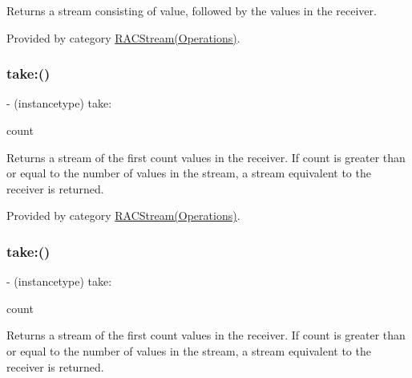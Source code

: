 Returns a stream consisting of {\ttfamily value}, followed by the values in the receiver. 

Provided by category \mbox{\hyperlink{category_r_a_c_stream_07_operations_08_a2f255fad695085b91a1ebc1e0a78c865}{R\+A\+C\+Stream(\+Operations)}}.

\mbox{\label{interface_r_a_c_stream_af0264b38dc4acd9334d2e42b1ce21b05}} 
\subsubsection{\texorpdfstring{take\+:()}{take:()}\hspace{0.1cm}{\footnotesize\ttfamily [1/3]}}
{\footnotesize\ttfamily -\/ (instancetype) take\+: \begin{DoxyParamCaption}\item[{(N\+S\+U\+Integer)}]{count }\end{DoxyParamCaption}}

Returns a stream of the first {\ttfamily count} values in the receiver. If {\ttfamily count} is greater than or equal to the number of values in the stream, a stream equivalent to the receiver is returned. 

Provided by category \mbox{\hyperlink{category_r_a_c_stream_07_operations_08_af0264b38dc4acd9334d2e42b1ce21b05}{R\+A\+C\+Stream(\+Operations)}}.

\mbox{\label{interface_r_a_c_stream_af0264b38dc4acd9334d2e42b1ce21b05}} 
\subsubsection{\texorpdfstring{take\+:()}{take:()}\hspace{0.1cm}{\footnotesize\ttfamily [2/3]}}
{\footnotesize\ttfamily -\/ (instancetype) take\+: \begin{DoxyParamCaption}\item[{(N\+S\+U\+Integer)}]{count }\end{DoxyParamCaption}}

Returns a stream of the first {\ttfamily count} values in the receiver. If {\ttfamily count} is greater than or equal to the number of values in the stream, a stream equivalent to the receiver is returned. 

